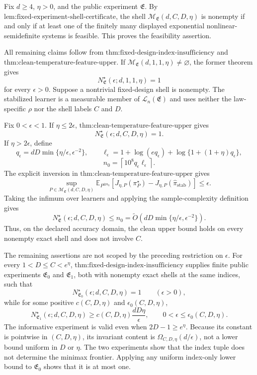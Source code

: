 Fix \(d\ge4\), \(\eta>0\), and the public experiment \(\mathfrak E\). By \(\text{lem:fixed-experiment-shell-certificate}\), the shell \(\mathcal M_{\mathfrak E}(d,C,D,\eta)\) is nonempty if and only if at least one of the finitely many displayed exponential nonlinear-semidefinite systems is feasible. This proves the feasibility assertion.

All remaining claims follow from \(\text{thm:fixed-design-index-insufficiency}\) and \(\text{thm:clean-temperature-feature-upper}\). If \(\mathcal M_{\mathfrak E}(d,1,1,\eta)\ne\varnothing\), the former theorem gives
\[
N^\star_{\mathfrak E}(\epsilon;d,1,1,\eta)=1
\]
for every \(\epsilon>0\). Suppose a nontrivial fixed-design shell is nonempty. The stabilized learner is a measurable member of \(\mathcal L_n(\mathfrak E)\) and uses neither the law-specific \(\rho\) nor the shell labels \(C\) and \(D\).

Fix \(0<\epsilon<1\). If \(\eta\le2\epsilon\), \(\text{thm:clean-temperature-feature-upper}\) gives
\[
N^\star_{\mathfrak E}(\epsilon;d,C,D,\eta)=1.
\]
If \(\eta>2\epsilon\), define
\[
q_\epsilon=dD\min\{\eta/\epsilon,\epsilon^{-2}\},
\qquad
\ell_\epsilon=1+\log(eq_\epsilon)+\log\{1+(1+\eta)q_\epsilon\},
\]
\[
n_0=\left\lceil10^8q_\epsilon\ell_\epsilon\right\rceil.
\]
The explicit inversion in \(\text{thm:clean-temperature-feature-upper}\) gives
\[
\sup_{P\in\mathcal M_{\mathfrak E}(d,C,D,\eta)}
\mathbb E_{P^{\otimes n_0}}
\left[J_{\eta,P}(\pi_P^\star)-J_{\eta,P}(\widehat\pi_{\mathrm{stab}})\right]
\le\epsilon.
\]
Taking the infimum over learners and applying the sample-complexity definition gives
\[
N^\star_{\mathfrak E}(\epsilon;d,C,D,\eta)
\le n_0
=\widetilde O\!\left(dD\min\{\eta/\epsilon,\epsilon^{-2}\}\right).
\]
Thus, on the declared accuracy domain, the clean upper bound holds on every nonempty exact shell and does not involve \(C\).

The remaining assertions are not scoped by the preceding restriction on \(\epsilon\). For every \(1<D\le C<e^\eta\), \(\text{thm:fixed-design-index-insufficiency}\) supplies finite public experiments \(\mathfrak E_0\) and \(\mathfrak E_1\), both with nonempty exact shells at the same indices, such that
\[
N^\star_{\mathfrak E_0}(\epsilon;d,C,D,\eta)=1
\qquad(\epsilon>0),
\]
while for some positive \(c(C,D,\eta)\) and \(\epsilon_0(C,D,\eta)\),
\[
N^\star_{\mathfrak E_1}(\epsilon;d,C,D,\eta)
\ge c(C,D,\eta)\frac{dD\eta}{\epsilon},
\qquad 0<\epsilon\le\epsilon_0(C,D,\eta).
\]
The informative experiment is valid even when \(2D-1\ge e^\eta\). Because its constant is pointwise in \((C,D,\eta)\), its invariant content is \(\Omega_{C,D,\eta}(d/\epsilon)\), not a lower bound uniform in \(D\) or \(\eta\). The two experiments show that the index tuple does not determine the minimax frontier. Applying any uniform index-only lower bound to \(\mathfrak E_0\) shows that it is at most one.

